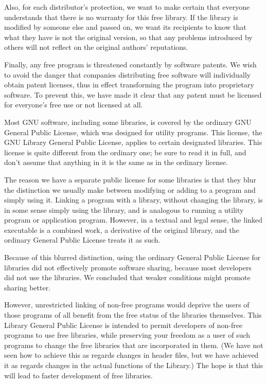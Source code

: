 \begin{DoxyVerb}
Also, for each distributor's protection, we want to make certain that everyone understands that
there is no warranty for this free library. If the library is modified by someone else and passed
on, we want its recipients to know that what they have is not the original version, so that any
problems introduced by others will not reflect on the original authors' reputations.

Finally, any free program is threatened constantly by software patents. We wish to avoid the danger
that companies distributing free software will individually obtain patent licenses, thus in effect
transforming the program into proprietary software. To prevent this, we have made it clear that any
patent must be licensed for everyone's free use or not licensed at all.

Most GNU software, including some libraries, is covered by the ordinary GNU General Public License,
which was designed for utility programs. This license, the GNU Library General Public License,
applies to certain designated libraries. This license is quite different from the ordinary one; be
sure to read it in full, and don't assume that anything in it is the same as in the ordinary license.

The reason we have a separate public license for some libraries is that they blur the distinction we
usually make between modifying or adding to a program and simply using it. Linking a program with a
library, without changing the library, is in some sense simply using the library, and is analogous
to running a utility program or application program. However, in a textual and legal sense, the
linked executable is a combined work, a derivative of the original library, and the ordinary General
Public License treats it as such.

Because of this blurred distinction, using the ordinary General Public License for libraries did not
effectively promote software sharing, because most developers did not use the libraries. We
concluded that weaker conditions might promote sharing better.

However, unrestricted linking of non-free programs would deprive the users of those programs of all
benefit from the free status of the libraries themselves. This Library General Public License is
intended to permit developers of non-free programs to use free libraries, while preserving your
freedom as a user of such programs to change the free libraries that are incorporated in them. (We
have not seen how to achieve this as regards changes in header files, but we have achieved it as
regards changes in the actual functions of the Library.) The hope is that this will lead to faster
development of free libraries.


\end{DoxyVerb}
